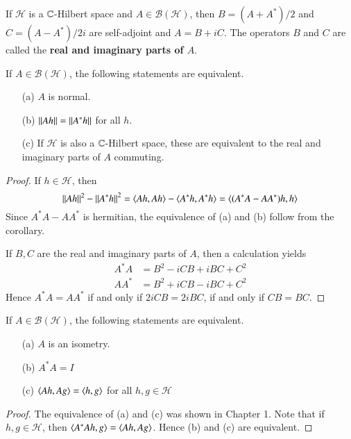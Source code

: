 If $\mathscr{H}$ is a $\mathbb C$-Hilbert space and $A \in \mathscr{B}(\mathscr{H})$, then $B = (A+A^*)/2$ and $C = (A-A^*)/2i$ are self-adjoint and $A = B+iC$. The operators $B$ and $C$ are called the \textbf{real and imaginary parts of $A$}.

\begin{prop}
    If $A \in \mathscr{B}(\mathscr{H})$, the following statements are equivalent. \begin{enumerate}
        \item[(a)] $A$ is normal.
        \item[(b)] $\left|\left| Ah\right|\right| = \left|\left| A^*h\right|\right|$ for all $h$.
        \item[(c)] If $\mathscr{H}$ is also a $\mathbb C$-Hilbert space, these are equivalent to the real and imaginary parts of $A$ commuting.
    \end{enumerate}
\end{prop}
\begin{proof}
    If $h \in \mathscr{H}$, then $$\left|\left| Ah\right|\right|^2 - \left|\left| A^*h\right|\right|^2 = \left\langle Ah, Ah\right\rangle - \left\langle A^*h, A^*h\right\rangle = \left\langle (A^*A-AA^*)h, h\right\rangle$$
    Since $A^*A-AA^*$ is hermitian, the equivalence of (a) and (b) follow from the corollary.

    If $B,C$ are the real and imaginary parts of $A$, then a calculation yields \begin{align*}
        A^*A &= B^2-iCB + iBC + C^2 \\
        AA^* &= B^2 + iCB - iBC + C^2
    \end{align*}
    Hence $A^*A = AA^*$ if and only if $2iCB = 2iBC$, if and only if $CB = BC$.
\end{proof}

\begin{prop}
    If $A \in \mathscr{B}(\mathscr{H})$, the following statements are equivalent. \begin{enumerate}
        \item[(a)] $A$ is an isometry.
        \item[(b)] $A^*A = I$
        \item[(c)] $\left\langle Ah, Ag\right\rangle = \left\langle h, g\right\rangle$ for all $h,g \in \mathscr{H}$
    \end{enumerate}
\end{prop}
\begin{proof}
    The equivalence of (a) and (c) was shown in Chapter 1. Note that if $h,g \in \mathscr{H}$, then $\left\langle A^*Ah, g\right\rangle = \left\langle Ah, Ag\right\rangle$. Hence (b) and (c) are equivalent.
\end{proof}

